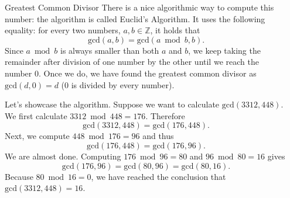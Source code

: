 \documentclass[final]{beamer}
\newlength{\sepwidth}
\newlength{\colwidth}
\newcommand{\separatorcolumn}{\begin{column}{\sepwidth}\end{column}}
\newcommand{\Z}{\mathbb{Z}}
\begin{document}
\begin{frame}[t]
\begin{columns}[t]
\begin{column}{\colwidth}
\begin{exampleblock}{Greatest Common Divisor}
 There is a nice \alert{algorithmic way} to compute this number: the algorithm
 is called \alert{Euclid's Algorithm}. It uses the following equality: for every
 two numbers, $a,b \in \Z$, it holds that
 \[
  \mathrm{gcd}(a,b) = \mathrm{gcd}(a \bmod b, b).
 \]
 Since $a \bmod b$ is always smaller than both $a$ and $b$, we keep taking the
 remainder after division of one number by the other until we reach the number
 $0$. Once we do, we have found the greatest common divisor as
 $\mathrm{gcd}(d,0) = d$ ($0$ is divided by every number).

 Let's showcase the algorithm. Suppose we want to calculate $\mathrm{gcd}(3312,
 448)$. We first calculate $3312 \bmod 448 = 176$. Therefore
 \[
  \mathrm{gcd}(3312, 448) = \mathrm{gcd}(176, 448).
 \]
 Next, we compute $448 \bmod 176 = 96$ and thus
 \[
  \mathrm{gcd}(176, 448) = \mathrm{gcd}(176, 96).
 \]
 We are almost done. Computing $176 \bmod 96 = 80$ and $96 \bmod 80 = 16$ gives
 \[
  \mathrm{gcd}(176, 96) = \mathrm{gcd}(80, 96) = \mathrm{gcd}(80, 16).
 \]
 Because $80 \bmod 16 = 0$, we have reached the conclusion that
 $\mathrm{gcd}(3312, 448) = 16$.
\end{exampleblock}

\end{column}
\separatorcolumn

\end{columns}
\end{frame}
\end{document}
